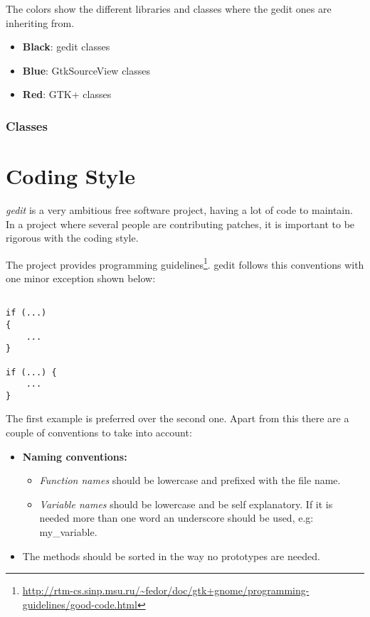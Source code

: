 The colors show the different libraries and classes where the gedit ones are inheriting from.
\begin{itemize}
  \item \textbf{Black}: gedit classes
  \item \textbf{Blue}: GtkSourceView classes
  \item \textbf{Red}: GTK+ classes
\end{itemize}

\subsubsection{Classes}

\section{Coding Style}\label{sec:CodingStyle}

\emph{gedit} is a very ambitious free software project, having a lot of code to maintain. In a project where several people are contributing patches, it is important to be rigorous with the coding style.

The \GNOME project provides programming guidelines\footnote{\url{http://rtm-cs.sinp.msu.ru/~fedor/doc/gtk+gnome/programming-guidelines/good-code.html}}. gedit follows this conventions with one minor exception shown below:
\begin{lstlisting}[style=GObject]

if (...)
{
	...
}

if (...) {
	...
}

\end{lstlisting}

The first example is preferred over the second one. Apart from this there are a couple of conventions to take into account:
\begin{itemize}
  \item \textbf{Naming conventions:}
    \begin{itemize}
      \item \emph{Function names} should be lowercase and prefixed with the file name.
      \item \emph{Variable names} should be lowercase and be self explanatory. If it is needed more than one word an underscore should be used, e.g:  my\_variable.
    \end{itemize}
  \item The methods should be sorted in the way no prototypes are needed.
\end{itemize}

